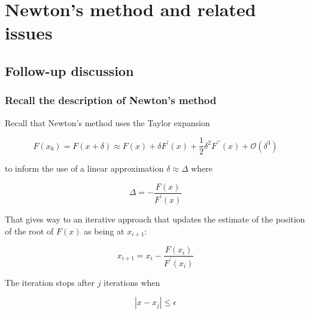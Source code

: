 \documentclass[hyperref={colorlinks=true}]{beamer}
\begin{document}
\section[Newton's method and related issues]{Newton's method and related issues}

\subsection[Follow-up discussion]{Follow-up discussion}

\begin{frame}%
  \frametitle{Recall the description of Newton's method}

  Recall that Newton's method uses the Taylor expansion
  
  \begin{equation}
    F(x_0) = F(x+\delta) \approx F(x) + \delta F^{\prime}(x) + \frac{1}{2}\delta^2 F^{\prime\prime}(x) + \mathcal{O}(\delta^3)
  \end{equation}
  
  to inform the use of a linear approximation $\delta \approx \Delta$ where
  
  \begin{equation}
    \Delta = - \frac{F(x)}{F^{\prime}(x)}
  \end{equation}
  
  That gives way to an iterative approach that updates the estimate of the position of the root of $F(x)$ as being at $x_{i+1}$:
  
  \begin{equation}
    x_{i+1} = x_{i} - \frac{F(x_i)}{F^{\prime}(x_i)}
  \end{equation}
  
  The iteration stops after $j$ iterations when 
  
  \begin{equation}
   | x - x_j | \leq \epsilon
  \end{equation}  

\end{frame}

\end{document}
